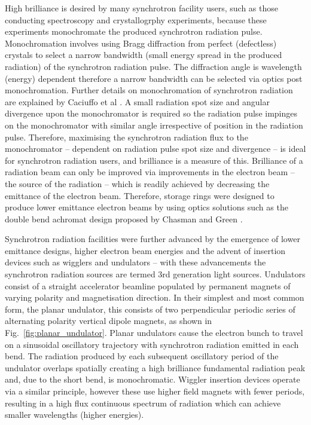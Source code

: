 \documentclass[../main.tex]{subfiles}
\begin{document}
High brilliance is desired by many synchrotron facility users, such as those conducting spectroscopy and crystallogrphy experiments, because these experiments monochromate the produced synchrotron radiation pulse. Monochromation involves using Bragg diffraction from perfect (defectless) crystals to select a narrow bandwidth (small energy spread in the produced radiation) of the synchrotron radiation pulse. The diffraction angle is wavelength (energy) dependent therefore a narrow bandwidth can be selected via optics post monochromation. Further details on monochromation of synchrotron radiation are explained by Caciuffo et al \cite{caciuffo1987monochromators}. A small radiation spot size and angular divergence upon the monochromator is required so the radiation pulse impinges on the monochromator with similar angle irrespective of position in the radiation pulse. Therefore, maximising the synchrotron radiation flux to the monochromator -- dependent on radiation pulse spot size and divergence -- is ideal for synchrotron radiation users, and brilliance is a measure of this. Brilliance of a radiation beam can only be improved via improvements in the electron beam -- the source of the radiation -- which is readily achieved by decreasing the emittance of the electron beam. Therefore, storage rings were designed to produce lower emittance electron beams by using optics solutions such as the double bend achromat design proposed by Chasman and Green \cite{chasman1975preliminary}.          

Synchrotron radiation facilities were further advanced by the emergence of lower emittance designs, higher electron beam energies and the advent of insertion devices such as wigglers and undulators -- with these advancements the synchrotron radiation sources are termed 3rd generation light sources. Undulators consist of a straight accelerator beamline populated by permanent magnets of varying polarity and magnetisation direction. In their simplest and most common form, the planar undulator, this consists of two perpendicular periodic series of alternating polarity vertical dipole magnets, as shown in Fig.~\ref{fig:planar_undulator}. Planar undulators cause the electron bunch to travel on a sinusoidal oscillatory trajectory with synchrotron radiation emitted in each bend. The radiation produced by each subsequent oscillatory period of the undulator overlaps spatially creating a high brilliance fundamental radiation peak and, due to the short bend, is monochromatic. Wiggler insertion devices operate via a similar principle, however these use higher field magnets with fewer periods, resulting in a high flux continuous spectrum of radiation which can achieve smaller wavelengths (higher energies). 
\end{document}

